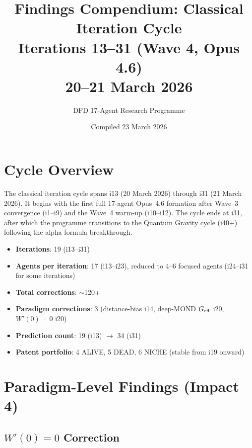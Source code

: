 \documentclass[11pt,a4paper]{article}
\title{\textbf{Findings Compendium: Classical Iteration Cycle}\\[6pt]
{\large Iterations 13--31 (Wave 4, Opus 4.6)}\\[4pt]
{\normalsize 20--21 March 2026}}
\author{DFD 17-Agent Research Programme}
\date{Compiled 23 March 2026}
\begin{document}
\maketitle
\tableofcontents
\newpage


\section{Cycle Overview}

The classical iteration cycle spans i13 (20 March 2026) through i31
(21 March 2026). It begins with the first full 17-agent Opus~4.6
formation after Wave~3 convergence (i1--i9) and the Wave~4 warm-up
(i10--i12). The cycle ends at i31, after which the programme transitions
to the Quantum Gravity cycle (i40+) following the alpha formula
breakthrough.

\begin{itemize}
  \item \textbf{Iterations}: 19 (i13--i31)
  \item \textbf{Agents per iteration}: 17 (i13--i23), reduced to 4--6
    focused agents (i24--i31 for some iterations)
  \item \textbf{Total corrections}: $\sim$120+
  \item \textbf{Paradigm corrections}: 3 (distance-bias i14, deep-MOND
    $G_{\rm eff}$ i20, $W'(0)=0$ i20)
  \item \textbf{Prediction count}: 19 (i13) $\to$ 34 (i31)
  \item \textbf{Patent portfolio}: 4 ALIVE, 5 DEAD, 6 NICHE (stable
    from i19 onward)
\end{itemize}


\section{Paradigm-Level Findings (Impact 4)}
\label{sec:impact4}

\subsection{$W'(0) = 0$ Correction}
\label{sec:wprime0}
\end{document}

